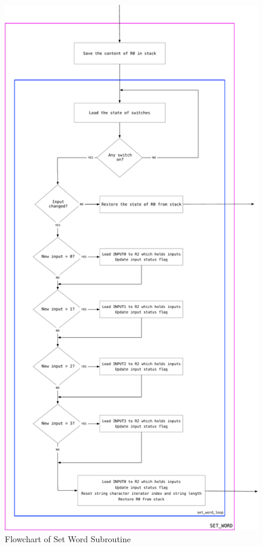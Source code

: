 \documentclass[titlepage]{article}
\begin{document}
	\begin{figure}[h]
		\centering
		\includegraphics[scale=.3]{../images/set_word.pdf}
		\caption{Flowchart of Set Word Subroutine}
	\end{figure}
\end{document}
